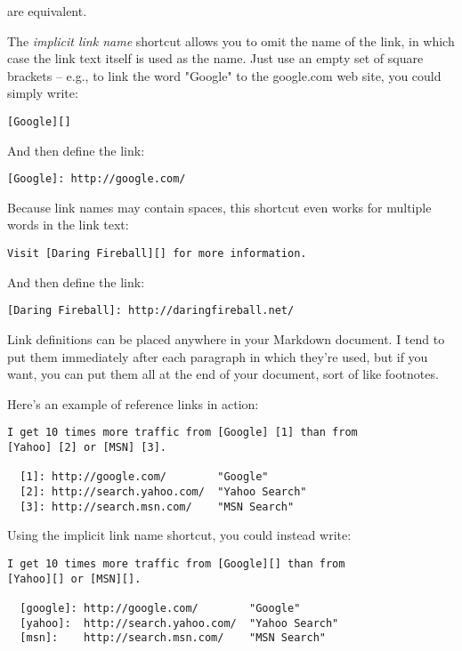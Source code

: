 are equivalent.



The \emph{implicit link name} shortcut allows you to omit the name of the
link, in which case the link text itself is used as the name.
Just use an empty set of square brackets -- e.g., to link the word
"Google" to the google.com web site, you could simply write:

\begin{lstlisting}
[Google][]
\end{lstlisting}




And then define the link:

\begin{lstlisting}
[Google]: http://google.com/
\end{lstlisting}




Because link names may contain spaces, this shortcut even works for
multiple words in the link text:

\begin{lstlisting}
Visit [Daring Fireball][] for more information.
\end{lstlisting}




And then define the link:

\begin{lstlisting}
[Daring Fireball]: http://daringfireball.net/
\end{lstlisting}




Link definitions can be placed anywhere in your Markdown document. I
tend to put them immediately after each paragraph in which they're
used, but if you want, you can put them all at the end of your
document, sort of like footnotes.



Here's an example of reference links in action:

\begin{lstlisting}
I get 10 times more traffic from [Google] [1] than from
[Yahoo] [2] or [MSN] [3].

  [1]: http://google.com/        "Google"
  [2]: http://search.yahoo.com/  "Yahoo Search"
  [3]: http://search.msn.com/    "MSN Search"
\end{lstlisting}




Using the implicit link name shortcut, you could instead write:

\begin{lstlisting}
I get 10 times more traffic from [Google][] than from
[Yahoo][] or [MSN][].

  [google]: http://google.com/        "Google"
  [yahoo]:  http://search.yahoo.com/  "Yahoo Search"
  [msn]:    http://search.msn.com/    "MSN Search"
\end{lstlisting}




